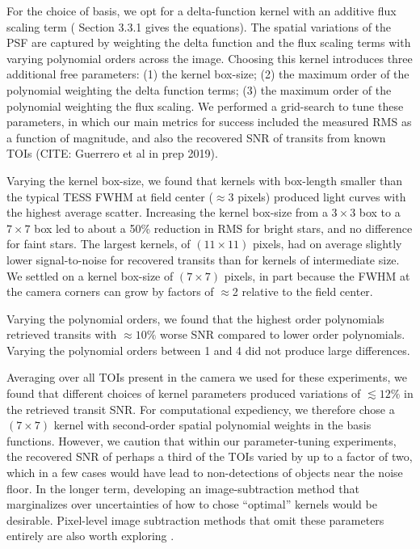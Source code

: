 \documentclass[12pt,twocolumn,tighten]{aastex62}
\begin{document}
For the choice of basis, we opt for a delta-function kernel with an additive
flux scaling term (\citealt{soares-furtado_image_2017} Section 3.3.1
gives the equations).
The spatial variations of the PSF are captured by weighting the 
delta function and the flux scaling terms with varying
polynomial orders across the image.
Choosing this kernel introduces three additional
free parameters:
(1) the kernel box-size;
(2) the maximum order of the polynomial weighting the delta function terms;
(3) the maximum order of the polynomial weighting the flux scaling.
We performed a grid-search to tune these parameters, in
which our main metrics for success included the measured RMS as
a function of magnitude, and also the recovered SNR of transits from
known TOIs (CITE: Guerrero et al in prep 2019).

Varying the kernel box-size, we found that kernels with box-length smaller than the 
typical TESS FWHM at field center ($\approx$3 pixels) produced light curves
with the highest average scatter.
Increasing the kernel box-size from a $3\times3$ box to a $7\times7$ box led
to about a 50\% reduction in RMS for bright stars, and no difference for 
faint stars.
The largest kernels, of $(11\times11)$ pixels, had on average slightly lower 
signal-to-noise for recovered transits than for kernels of intermediate size.
We settled on a kernel box-size of $(7\times7)$ pixels, in part because the 
FWHM at the camera corners can grow by factors of $\approx$2 relative to the 
field center.

Varying the polynomial orders, we found that the highest order polynomials 
retrieved transits with $\approx10\%$ worse SNR compared to lower order
polynomials.
Varying the polynomial orders between 1 and 4 did not produce large 
differences.

Averaging over all TOIs present in the camera we used for these experiments, 
we found that different choices 
of kernel parameters produced variations of $\lesssim 12\%$ in the retrieved 
transit SNR.  
For computational expediency, we therefore chose a $(7\times 7)$ kernel with 
second-order spatial polynomial weights in the basis functions.
However, we caution that within our parameter-tuning experiments, the 
recovered SNR of perhaps a third of the TOIs varied by up to a factor of two,
which in a few 
cases would have lead to non-detections of objects near the noise floor.
In the longer term, developing an image-subtraction method that marginalizes 
over uncertainties of how to chose ``optimal'' kernels would be desirable.
Pixel-level image subtraction methods that omit these 
parameters entirely 
are also worth exploring \citep{wang_pixel-level_2017}.
\end{document}
